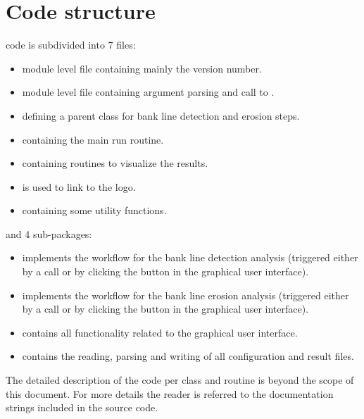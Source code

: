 \chapter{Code structure}

\dfastbe code is subdivided into 7 files:

\begin{itemize}
	\item {} module level file containing mainly the version number.
	\item {} module level file containing argument parsing and call to .
	\item {} defining a parent  class for bank line detection and erosion steps.
	\item {} containing the main run routine.
	\item {} containing routines to visualize the results.
	\item {} is used to link to the \dfastbe logo.
	\item {} containing some utility functions.
\end{itemize}

and 4 sub-packages:

\begin{itemize}
	\item {} implements the workflow for the bank line detection analysis (triggered either by a  call or by clicking the  button in the graphical user interface).
	\item {} implements the workflow for the bank line erosion analysis (triggered either by a  call or by clicking the  button in the graphical user interface).
	\item {} contains all functionality related to the graphical user interface.
	\item {} contains the reading, parsing and writing of all configuration and result files.
\end{itemize}

The detailed description of the code per class and routine is beyond the scope of this document.
For more details the reader is referred to the documentation strings included in the source code.
